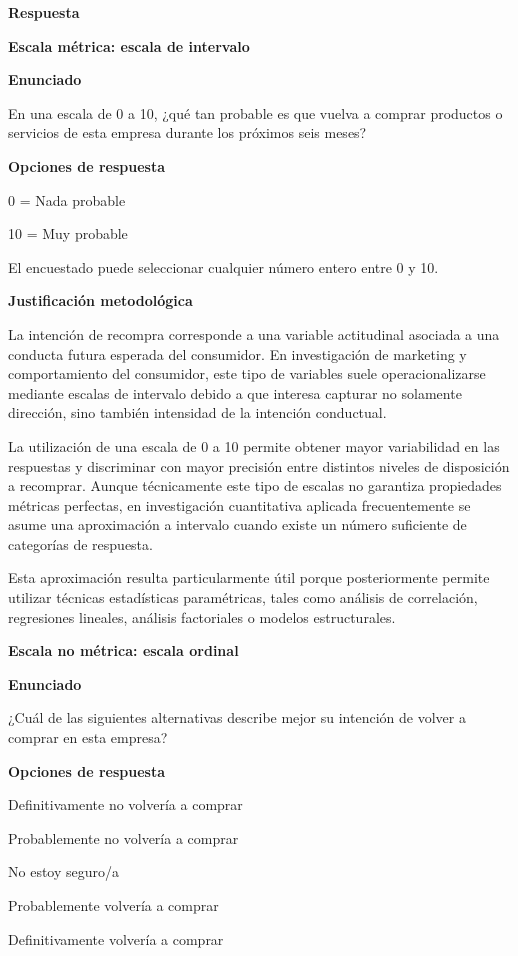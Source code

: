 \documentclass[12pt,letterpaper]{article}
\begin{document}
\textbf{Respuesta}

\textbf{Escala métrica: escala de intervalo}

\textbf{Enunciado}

En una escala de 0 a 10, ¿qué tan probable es que vuelva a comprar productos o servicios de esta empresa durante los próximos seis meses?

\textbf{Opciones de respuesta}

0 = Nada probable

10 = Muy probable

El encuestado puede seleccionar cualquier número entero entre 0 y 10.

\textbf{Justificación metodológica}

La intención de recompra corresponde a una variable actitudinal asociada a una conducta futura esperada del consumidor. En investigación de marketing y comportamiento del consumidor, este tipo de variables suele operacionalizarse mediante escalas de intervalo debido a que interesa capturar no solamente dirección, sino también intensidad de la intención conductual.

La utilización de una escala de 0 a 10 permite obtener mayor variabilidad en las respuestas y discriminar con mayor precisión entre distintos niveles de disposición a recomprar. Aunque técnicamente este tipo de escalas no garantiza propiedades métricas perfectas, en investigación cuantitativa aplicada frecuentemente se asume una aproximación a intervalo cuando existe un número suficiente de categorías de respuesta.

Esta aproximación resulta particularmente útil porque posteriormente permite utilizar técnicas estadísticas paramétricas, tales como análisis de correlación, regresiones lineales, análisis factoriales o modelos estructurales.

\textbf{Escala no métrica: escala ordinal}

\textbf{Enunciado}

¿Cuál de las siguientes alternativas describe mejor su intención de volver a comprar en esta empresa?

\textbf{Opciones de respuesta}

\begin{opciones}
\item Definitivamente no volvería a comprar
\item Probablemente no volvería a comprar
\item No estoy seguro/a
\item Probablemente volvería a comprar
\item Definitivamente volvería a comprar
\end{opciones}
\end{document}
